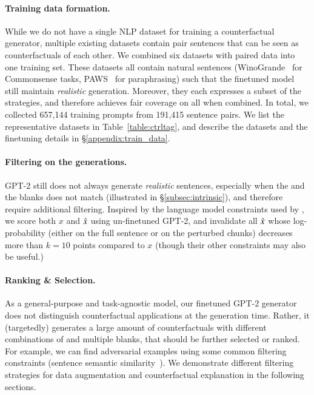 
\paragraph{Training data formation.}
While we do not have a single NLP dataset for training a counterfactual generator, multiple existing datasets contain pair sentences that can be seen as counterfactuals of each other. 
We combined six datasets with paired data into one training set.
These datasets all contain natural sentences (\eg WinoGrande~\cite{sakaguchi2019winogrande} for Commonsense tasks, PAWS~\cite{zhang2019paws} for paraphrasing) such that the finetuned model still maintain \emph{realistic} generation.
Moreover, they each expresses a subset of the strategies, and therefore achieves fair coverage on all \tagstrs when combined.
In total, we collected 657,144 training prompts from 191,415 sentence pairs.
We list the representative datasets in Table~\ref{table:ctrltag}, and describe the datasets and the finetuning details in \S\ref{appendix:train_data}.


\paragraph{Filtering on the generations.}
GPT-2 still does not always generate \emph{realistic} sentences, especially when the \tagstr and the blanks does not match (illustrated in \S\ref{subsec:intrinsic}), and therefore require additional filtering.
Inspired by the language model constraints used by \citet{morris2020textattack}, we score both $x$ and $\hat{x}$ using un-finetuned GPT-2, and invalidate all $\hat{x}$ whose log-probability (either on the full sentence or on the perturbed chunks) decreases more than $k=10$ points compared to $x$ (though their other constraints may also be useful.)


\paragraph{Ranking \& Selection.}
As a general-purpose and task-agnostic model, our finetuned GPT-2 generator does not distinguish counterfactual applications at the generation time.
Rather, it (targetedly) generates a large amount of counterfactuals with different combinations of \tagstrs and multiple blanks, that should be further selected or ranked.
For example, we can find adversarial examples using some common filtering constraints (\eg sentence semantic similarity~\cite{morris2020textattack}).
We demonstrate different filtering strategies for data augmentation and counterfactual explanation in the following sections.


